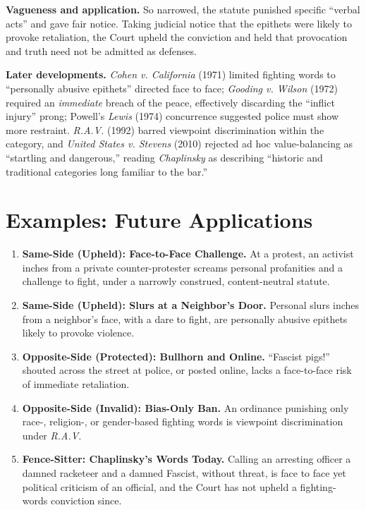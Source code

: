 \documentclass[12pt]{article}
\begin{document}
\textbf{Vagueness and application.} So narrowed, the statute punished specific ``verbal acts'' and gave fair notice. Taking judicial notice that the epithets were likely to provoke retaliation, the Court upheld the conviction and held that provocation and truth need not be admitted as defenses.

\textbf{Later developments.} \textit{Cohen v. California} (1971) limited fighting words to ``personally abusive epithets'' directed face to face; \textit{Gooding v. Wilson} (1972) required an \textit{immediate} breach of the peace, effectively discarding the ``inflict injury'' prong; Powell's \textit{Lewis} (1974) concurrence suggested police must show more restraint. \textit{R.A.V.} (1992) barred viewpoint discrimination within the category, and \textit{United States v. Stevens} (2010) rejected ad hoc value-balancing as ``startling and dangerous,'' reading \textit{Chaplinsky} as describing ``historic and traditional categories long familiar to the bar.''

\section{Examples: Future Applications}

\begin{enumerate}
\item \textbf{Same-Side (Upheld): Face-to-Face Challenge.} At a protest, an activist inches from a private counter-protester screams personal profanities and a challenge to fight, under a narrowly construed, content-neutral statute.
\item \textbf{Same-Side (Upheld): Slurs at a Neighbor's Door.} Personal slurs inches from a neighbor's face, with a dare to fight, are personally abusive epithets likely to provoke violence.
\item \textbf{Opposite-Side (Protected): Bullhorn and Online.} ``Fascist pigs!'' shouted across the street at police, or posted online, lacks a face-to-face risk of immediate retaliation.
\item \textbf{Opposite-Side (Invalid): Bias-Only Ban.} An ordinance punishing only race-, religion-, or gender-based fighting words is viewpoint discrimination under \textit{R.A.V.}
\item \textbf{Fence-Sitter: Chaplinsky's Words Today.} Calling an arresting officer a damned racketeer and a damned Fascist, without threat, is face to face yet political criticism of an official, and the Court has not upheld a fighting-words conviction since.
\end{enumerate}
\end{document}
